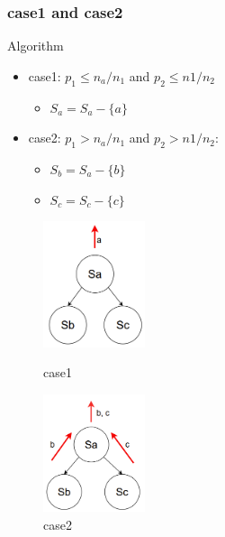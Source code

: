 \documentclass[notheorems, aspectratio=54]{beamer}
\begin{document}
\begin{frame}
    \frametitle{case1 and case2}
    \begin{block}{Algorithm}
        \begin{itemize}
            \item case1: $p_1 \leq n_a/n_1$  and  $p_2 \leq n1/n_2$
            \begin{itemize}
                \item $S_a = S_a - \{a\}$
            \end{itemize}
            \item case2: $p_1 > n_a/n_1$  and  $p_2 > n1/n_2$:
            \begin{itemize}
                \item $S_b = S_a - \{b\}$
                \item $S_c = S_c - \{c\}$
            \end{itemize}
        \end{itemize} 
    \end{block}
    \begin{figure}[htbp]
        \centering
        \begin{minipage}[t]{0.48\textwidth}
        \centering
        \includegraphics[width=3cm]{global_img_dir/Sampling1.png}
        \caption{case1}
        \end{minipage}
        \begin{minipage}[t]{0.48\textwidth}
        \centering
        \includegraphics[width=3cm]{global_img_dir/Sampling2.png}
        \caption{case2}
        \end{minipage}
    \end{figure}
\end{frame}
\end{document}
